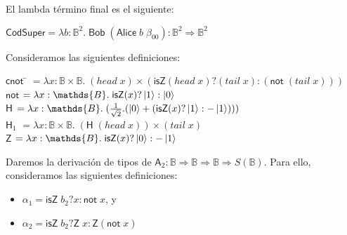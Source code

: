 \documentclass[a4paper,11pt]{article}
\begin{document}
El lambda término final es el siguiente:

\begin{tabbing}
  $\textsf{CodSuper} = \lambda b : \mathds{B}^2. \; \textsf{Bob} \; (\textsf{Alice} \; b \; \beta_{00}) 
  : \mathds{B}^2 \Rightarrow \mathds{B}^2$
\end{tabbing}

Consideramos las siguientes definiciones:

\begin{tabbing}
  $\textsf{cnot}$ \= $= \lambda x: \mathds{B} \times \mathds{B}. \; ( head \; x) \times (\textsf{isZ}( head \; x) ?
  (tail \; x) : (\textsf{not} \; (tail \; x)))$ \\

  $\textsf{not}$ \> $= \lambda x: \mathds{B}. \; \textsf{isZ}(x) ? \ket{1} : \ket{0}$ \\

  $\textsf{H}$ \> $= \lambda x : \mathds{B}. \; (\frac{1}{\sqrt{2}}.(\ket{0} + (\textsf{isZ}(x) ? \ket{1} : -\ket{1})))$ \\

  $\textsf{H}_{1}$ \> $= \lambda x : \mathds{B} \times \mathds{B} . \; (\textsf{H} \; (head \; x)) \times (tail \; x)$ \\

  $\textsf{Z}$ \> $= \lambda x : \mathds{B}. \; \textsf{isZ}(x) ? \ket{0} : - \ket{1}$
\end{tabbing}

Daremos la derivación de tipos de $\textsf{A}_2 : \mathds{B} \Rightarrow \mathds{B} \Rightarrow \mathds{B} \Rightarrow S(\mathds{B})$.
Para ello, consideramos las siguientes definiciones: 

\begin{itemize}
\item $\alpha_1 = \textsf{isZ} \; b_2 ? x : \textsf{not} \; x$, y
\item $\alpha_2 = \textsf{isZ} \; b_2 ? \textsf{Z} \; x : \textsf{Z} (\textsf{not} \; x)$
\end{itemize}
\end{document}
